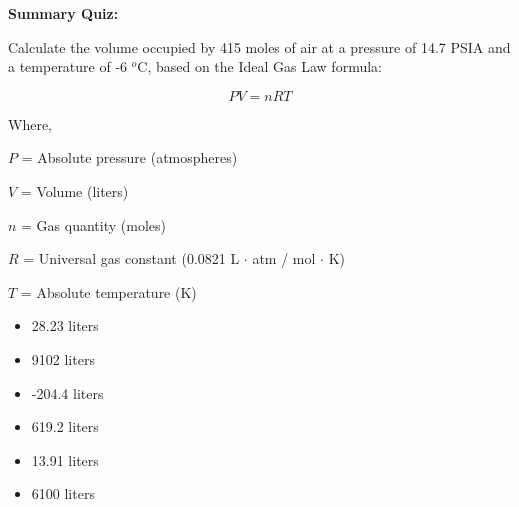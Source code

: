\vfil \eject

\noindent
{\bf Summary Quiz:}

Calculate the volume occupied by 415 moles of air at a pressure of 14.7 PSIA and a temperature of -6 $^{o}$C, based on the Ideal Gas Law formula:

$$PV = nRT$$

\noindent
Where,

$P$ = Absolute pressure (atmospheres)

$V$ = Volume (liters)

$n$ = Gas quantity (moles)

$R$ = Universal gas constant (0.0821 L $\cdot$ atm / mol $\cdot$ K)

$T$ = Absolute temperature (K)

\vskip 10pt

\begin{itemize}
\item{} 28.23 liters
\vskip 5pt 
\item{} 9102 liters
\vskip 5pt 
\item{} -204.4 liters
\vskip 5pt 
\item{} 619.2 liters
\vskip 5pt 
\item{} 13.91 liters
\vskip 5pt 
\item{} 6100 liters
\end{itemize}




